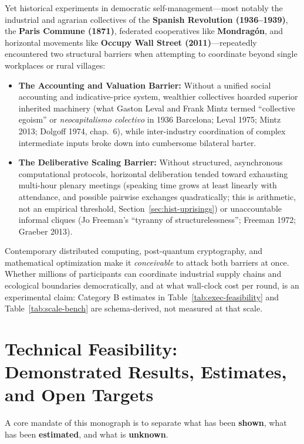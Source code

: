 \documentclass[10pt,twoside,openany]{book}
\theoremstyle{dpepstyle}
\begin{document}
Yet historical experiments in democratic self-management---most notably the industrial and agrarian collectives of the \textbf{Spanish Revolution (1936--1939)}, the \textbf{Paris Commune (1871)}, federated cooperatives like \textbf{Mondrag\'on}, and horizontal movements like \textbf{Occupy Wall Street (2011)}---repeatedly encountered two structural barriers when attempting to coordinate beyond single workplaces or rural villages:
\begin{itemize}[leftmargin=1.6em,itemsep=2pt]
  \item \textbf{The Accounting and Valuation Barrier:} Without a unified social accounting and indicative-price system, wealthier collectives hoarded superior inherited machinery (what Gaston Leval and Frank Mintz termed ``collective egoism'' or \emph{neocapitalismo colectivo} in 1936 Barcelona; Leval 1975; Mintz 2013; Dolgoff 1974, chap.~6), while inter-industry coordination of complex intermediate inputs broke down into cumbersome bilateral barter.
  \item \textbf{The Deliberative Scaling Barrier:} Without structured, asynchronous computational protocols, horizontal deliberation tended toward exhausting multi-hour plenary meetings (speaking time grows at least linearly with attendance, and possible pairwise exchanges quadratically; this is arithmetic, not an empirical threshold, Section~\ref{sec:hist-uprisings}) or unaccountable informal cliques (Jo Freeman's ``tyranny of structurelessness''; Freeman 1972; Graeber 2013).
\end{itemize}

Contemporary distributed computing, post-quantum cryptography, and mathematical optimization make it \emph{conceivable} to attack both barriers at once. Whether millions of participants can coordinate industrial supply chains and ecological boundaries democratically, and at what wall-clock cost per round, is an experimental claim: Category B estimates in Table~\ref{tab:exec-feasibility} and Table~\ref{tab:scale-bench} are schema-derived, not measured at that scale.

\section{Technical Feasibility: Demonstrated Results, Estimates, and Open Targets}

A core mandate of this monograph is to separate what has been \textbf{shown}, what has been \textbf{estimated}, and what is \textbf{unknown}.
\end{document}
